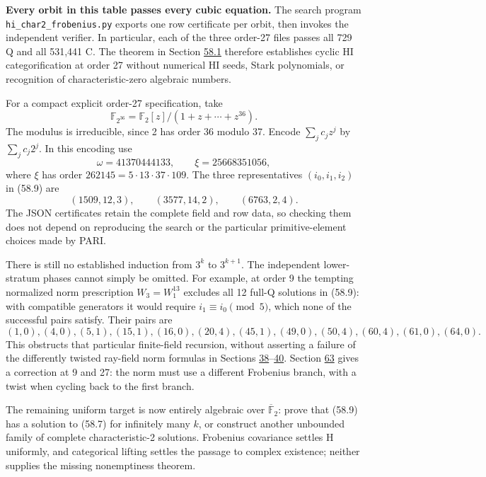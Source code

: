 \documentclass[11pt,reqno]{amsart}
\theoremstyle{plain}
\begin{document}
\textbf{Every orbit in this table passes every cubic equation.} The search
program \texttt{hi\_\allowbreak char2\_\allowbreak frobenius.py} exports one row certificate per orbit,
then invokes the independent verifier. In particular, each of the
three order-27 files passes all 729 Q and all 531,441 C. The theorem
in Section \hyperref[sec:58.1]{58.1} therefore establishes cyclic HI categorification at
order 27 without numerical HI seeds, Stark polynomials, or recognition
of characteristic-zero algebraic numbers.

For a compact explicit order-27 specification, take
\[
 \mathbb F_{2^{36}}=\mathbb F_2[z]/(1+z+\cdots+z^{36}).
\]
The modulus is irreducible, since 2 has order 36 modulo 37. Encode
\(\sum_j c_jz^j\) by \(\sum_j c_j2^j\). In this encoding use
\[
 \omega=41370444133,\qquad \xi=25668351056,
\]
where \(\xi\) has order \(262145=5\cdot13\cdot37\cdot109\).
The three representatives \((i_0,i_1,i_2)\) in (58.9) are
\begin{equation*}
 (1509,12,3),\qquad (3577,14,2),\qquad (6763,2,4).
 \tag{58.11}
\end{equation*}
The JSON certificates retain the complete field and row data, so
checking them does not depend on reproducing the search or the
particular primitive-element choices made by PARI.

There is still no established induction from \(3^k\) to \(3^{k+1}\).
The independent lower-stratum phases cannot simply be omitted. For
example, at order 9 the tempting normalized norm prescription
\(W_3=W_1^{13}\) excludes all 12 full-Q solutions in (58.9): with
compatible generators it would require \(i_1\equiv i_0\pmod5\),
which none of the successful pairs satisfy. Their pairs are
\[
 (1,0),(4,0),(5,1),(15,1),(16,0),(20,4),
 (45,1),(49,0),(50,4),(60,4),(61,0),(64,0).
\]
This obstructs that particular finite-field recursion, without
asserting a failure of the differently twisted ray-field norm formulas
in Sections \hyperref[sec:38]{38}--\hyperref[sec:40]{40}. Section \hyperref[sec:63]{63} gives a correction at 9 and 27: the norm
must use a different Frobenius branch, with a twist when cycling back
to the first branch.

The remaining uniform target is now entirely algebraic over
\(\overline{\mathbb F}_2\): prove that (58.9) has a solution to
(58.7) for infinitely many \(k\), or construct another unbounded
family of complete characteristic-2 solutions. Frobenius covariance
settles H uniformly, and categorical lifting settles the passage to
complex existence; neither supplies the missing nonemptiness theorem.
\end{document}
